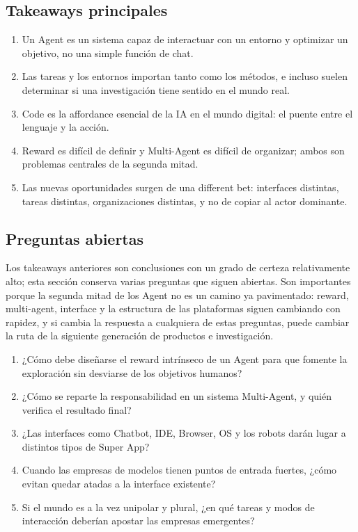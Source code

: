 \subsection{Takeaways principales}

\begin{enumerate}
\item Un Agent es un sistema capaz de interactuar con un entorno y optimizar un objetivo, no una simple función de chat.
\item Las tareas y los entornos importan tanto como los métodos, e incluso suelen determinar si una investigación tiene sentido en el mundo real.
\item Code es la affordance esencial de la IA en el mundo digital: el puente entre el lenguaje y la acción.
\item Reward es difícil de definir y Multi-Agent es difícil de organizar; ambos son problemas centrales de la segunda mitad.
\item Las nuevas oportunidades surgen de una different bet: interfaces distintas, tareas distintas, organizaciones distintas, y no de copiar al actor dominante.
\end{enumerate}

\subsection{Preguntas abiertas}

Los takeaways anteriores son conclusiones con un grado de certeza relativamente alto; esta sección conserva varias preguntas que siguen abiertas. Son importantes porque la segunda mitad de los Agent no es un camino ya pavimentado: reward, multi-agent, interface y la estructura de las plataformas siguen cambiando con rapidez, y si cambia la respuesta a cualquiera de estas preguntas, puede cambiar la ruta de la siguiente generación de productos e investigación.

\begin{enumerate}
\item ¿Cómo debe diseñarse el reward intrínseco de un Agent para que fomente la exploración sin desviarse de los objetivos humanos?
\item ¿Cómo se reparte la responsabilidad en un sistema Multi-Agent, y quién verifica el resultado final?
\item ¿Las interfaces como Chatbot, IDE, Browser, OS y los robots darán lugar a distintos tipos de Super App?
\item Cuando las empresas de modelos tienen puntos de entrada fuertes, ¿cómo evitan quedar atadas a la interface existente?
\item Si el mundo es a la vez unipolar y plural, ¿en qué tareas y modos de interacción deberían apostar las empresas emergentes?
\end{enumerate}

